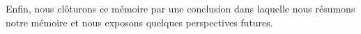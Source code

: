 \par Enfin, nous clôturons ce mémoire par une conclusion dans laquelle nous
résumons notre mémoire et nous exposons quelques perspectives
futures.





















